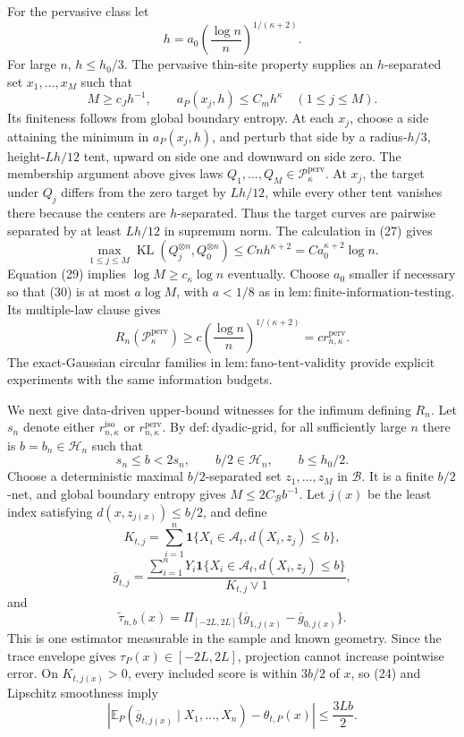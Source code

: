 For the pervasive class let
\[
 h=a_0\left(\frac{\log n}{n}\right)^{1/(\kappa+2)}.
\]
For large \(n\), \(h\le h_0/3\). The pervasive thin-site property supplies an \(h\)-separated set \(x_1,\ldots,x_M\) such that
\[
 M\ge c_Jh^{-1},
 \qquad a_P(x_j,h)\le C_mh^{\kappa}\quad(1\le j\le M). \tag{29}
\]
Its finiteness follows from global boundary entropy. At each \(x_j\), choose a side attaining the minimum in \(a_P(x_j,h)\), and perturb that side by a radius-\(h/3\), height-\(Lh/12\) tent, upward on side one and downward on side zero. The membership argument above gives laws \(Q_1,\ldots,Q_M\in\mathcal P_{\kappa}^{\mathrm{perv}}\). At \(x_j\), the target under \(Q_j\) differs from the zero target by \(Lh/12\), while every other tent vanishes there because the centers are \(h\)-separated. Thus the target curves are pairwise separated by at least \(Lh/12\) in supremum norm. The calculation in (27) gives
\[
 \max_{1\le j\le M}
 \operatorname{KL}(Q_j^{\otimes n},Q_0^{\otimes n})
 \le Cnh^{\kappa+2}
 =Ca_0^{\kappa+2}\log n. \tag{30}
\]
Equation (29) implies \(\log M\ge c_{\kappa}\log n\) eventually. Choose \(a_0\) smaller if necessary so that (30) is at most \(a\log M\), with \(a<1/8\) as in \(\mathrm{lem:finite\text{-}information\text{-}testing}\). Its multiple-law clause gives
\[
 R_n(\mathcal P_{\kappa}^{\mathrm{perv}})
 \ge c\left(\frac{\log n}{n}\right)^{1/(\kappa+2)}
 =c r_{n,\kappa}^{\mathrm{perv}}. \tag{31}
\]
The exact-Gaussian circular families in \(\mathrm{lem:fano\text{-}tent\text{-}validity}\) provide explicit experiments with the same information budgets.

We next give data-driven upper-bound witnesses for the infimum defining \(R_n\). Let \(s_n\) denote either \(r_{n,\kappa}^{\mathrm{iso}}\) or \(r_{n,\kappa}^{\mathrm{perv}}\). By \(\mathrm{def:dyadic\text{-}grid}\), for all sufficiently large \(n\) there is \(b=b_n\in\mathcal H_n\) such that
\[
 s_n\le b<2s_n,
 \qquad b/2\in\mathcal H_n,
 \qquad b\le h_0/2. \tag{32}
\]
Choose a deterministic maximal \(b/2\)-separated set \(z_1,\ldots,z_M\) in \(\mathcal B\). It is a finite \(b/2\)-net, and global boundary entropy gives \(M\le2C_{\mathcal B}b^{-1}\). Let \(j(x)\) be the least index satisfying \(d(x,z_{j(x)})\le b/2\), and define
\[
 K_{t,j}=\sum_{i=1}^n\mathbf1\{X_i\in\mathcal A_t, d(X_i,z_j)\le b\},
\]
\[
 \overline g_{t,j}
 =\frac{\sum_{i=1}^nY_i\mathbf1\{X_i\in\mathcal A_t, d(X_i,z_j)\le b\}}
 {K_{t,j}\vee1},
\]
and
\[
 \widetilde\tau_{n,b}(x)
 =\Pi_{[-2L,2L]}\{\overline g_{1,j(x)}-\overline g_{0,j(x)}\}. \tag{33}
\]
This is one estimator measurable in the sample and known geometry. Since the trace envelope gives \(\tau_P(x)\in[-2L,2L]\), projection cannot increase pointwise error. On \(K_{t,j(x)}>0\), every included score is within \(3b/2\) of \(x\), so (24) and Lipschitz smoothness imply
\[
 \left|\mathbb E_P(\overline g_{t,j(x)}\mid X_1,\ldots,X_n)
       -\theta_{t,P}(x)\right|
 \le\frac{3Lb}{2}. \tag{34}
\]

